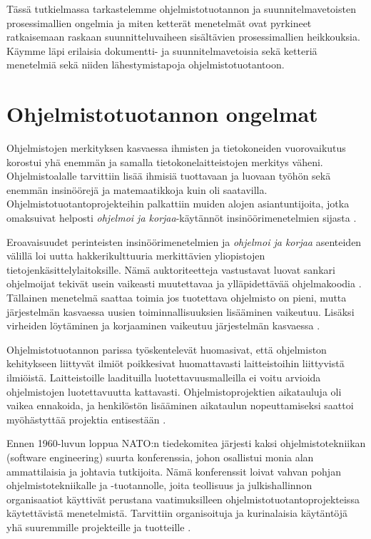 \documentclass[finnish]{tktltiki2}
\theoremstyle{definition}
\theoremstyle{remark}
\begin{document}
Tässä tutkielmassa tarkastelemme ohjelmistotuotannon ja suunnitelmavetoisten prosessimallien ongelmia ja miten ketterät menetelmät ovat pyrkineet ratkaisemaan raskaan suunnitteluvaiheen sisältävien prosessimallien heikkouksia. Käymme läpi erilaisia dokumentti- ja suunnitelmavetoisia sekä ketteriä menetelmiä sekä niiden lähestymistapoja ohjelmistotuotantoon.

\section{Ohjelmistotuotannon ongelmat}

Ohjelmistojen merkityksen kasvaessa ihmisten ja tietokoneiden vuorovaikutus korostui yhä enemmän ja samalla tietokonelaitteistojen merkitys väheni. Ohjelmistoalalle tarvittiin lisää ihmisiä tuottavaan ja luovaan työhön sekä enemmän insinöörejä ja matemaatikkoja kuin oli saatavilla. Ohjelmistotuotantoprojekteihin palkattiin muiden alojen asiantuntijoita, jotka omaksuivat helposti \textit{ohjelmoi ja korjaa}-käytännöt insinöörimenetelmien sijasta \cite{BOE06}.

Eroavaisuudet perinteisten insinöörimenetelmien ja \textit{ohjelmoi ja korjaa} asenteiden välillä loi uutta hakkerikulttuuria merkittävien yliopistojen tietojenkäsittelylaitoksille. Nämä auktoriteetteja vastustavat luovat sankari ohjelmoijat tekivät usein vaikeasti muutettavaa ja ylläpidettävää ohjelmakoodia \cite{BOE06}. Tällainen menetelmä saattaa toimia jos tuotettava ohjelmisto on pieni, mutta järjestelmän kasvaessa uusien toiminnallisuuksien lisääminen vaikeutuu. Lisäksi virheiden löytäminen ja korjaaminen vaikeutuu järjestelmän kasvaessa \cite{FOW01a}.

Ohjelmistotuotannon parissa työskentelevät huomasivat, että ohjelmiston kehitykseen liittyvät ilmiöt poikkesivat huomattavasti laitteistoihin liittyvistä ilmiöistä. Laitteistoille laadituilla luotettavuusmalleilla ei voitu arvioida ohjelmistojen luotettavuutta kattavasti. Ohjelmistoprojektien aikatauluja oli vaikea ennakoida, ja henkilöstön lisääminen aikataulun nopeuttamiseksi saattoi myöhästyttää projektia entisestään \cite{BOE06}.

Ennen 1960-luvun loppua NATO:n tiedekomitea järjesti kaksi ohjelmistotekniikan (software engineering) suurta konferenssia, johon osallistui monia alan ammattilaisia ja johtavia tutkijoita. Nämä konferenssit loivat vahvan pohjan ohjelmistotekniikalle ja -tuotannolle, joita teollisuus ja julkishallinnon organisaatiot käyttivät perustana vaatimuksilleen ohjelmistotuotantoprojekteissa käytettävistä menetelmistä. Tarvit\-tiin organisoituja ja kurinalaisia käytäntöjä yhä suuremmille projekteille ja tuotteille \cite{BOE06}.
\end{document}
